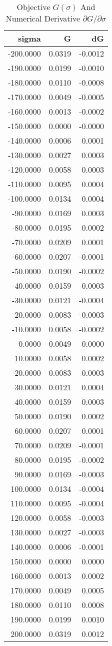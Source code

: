 \begin{table}[htbp]
    \centering
    \caption{Objective $G(\sigma)$ And Numerical Derivative $\partial G/\partial \sigma$}
    \label{tab:q7_Gsigma}
\begin{tabular}{rrr}
\toprule
sigma & G & dG \\
\midrule
\midrule
-200.0000 & 0.0319 & -0.0012 \\
-190.0000 & 0.0199 & -0.0010 \\
-180.0000 & 0.0110 & -0.0008 \\
-170.0000 & 0.0049 & -0.0005 \\
-160.0000 & 0.0013 & -0.0002 \\
-150.0000 & 0.0000 & -0.0000 \\
-140.0000 & 0.0006 & 0.0001 \\
-130.0000 & 0.0027 & 0.0003 \\
-120.0000 & 0.0058 & 0.0003 \\
-110.0000 & 0.0095 & 0.0004 \\
-100.0000 & 0.0134 & 0.0004 \\
-90.0000 & 0.0169 & 0.0003 \\
-80.0000 & 0.0195 & 0.0002 \\
-70.0000 & 0.0209 & 0.0001 \\
-60.0000 & 0.0207 & -0.0001 \\
-50.0000 & 0.0190 & -0.0002 \\
-40.0000 & 0.0159 & -0.0003 \\
-30.0000 & 0.0121 & -0.0004 \\
-20.0000 & 0.0083 & -0.0003 \\
-10.0000 & 0.0058 & -0.0002 \\
0.0000 & 0.0049 & 0.0000 \\
10.0000 & 0.0058 & 0.0002 \\
20.0000 & 0.0083 & 0.0003 \\
30.0000 & 0.0121 & 0.0004 \\
40.0000 & 0.0159 & 0.0003 \\
50.0000 & 0.0190 & 0.0002 \\
60.0000 & 0.0207 & 0.0001 \\
70.0000 & 0.0209 & -0.0001 \\
80.0000 & 0.0195 & -0.0002 \\
90.0000 & 0.0169 & -0.0003 \\
100.0000 & 0.0134 & -0.0004 \\
110.0000 & 0.0095 & -0.0004 \\
120.0000 & 0.0058 & -0.0003 \\
130.0000 & 0.0027 & -0.0003 \\
140.0000 & 0.0006 & -0.0001 \\
150.0000 & 0.0000 & 0.0000 \\
160.0000 & 0.0013 & 0.0002 \\
170.0000 & 0.0049 & 0.0005 \\
180.0000 & 0.0110 & 0.0008 \\
190.0000 & 0.0199 & 0.0010 \\
200.0000 & 0.0319 & 0.0012 \\
\bottomrule
\bottomrule
\end{tabular}

\end{table}
